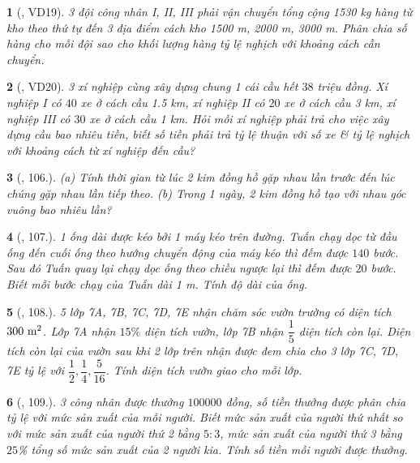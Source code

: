 \documentclass{article}
\newtheorem{baitoan}{}
\begin{document}
\begin{baitoan}[\cite{Binh_Toan_7_tap_1}, VD19]
	3 đội công nhân I, II, III phải vận chuyển tổng cộng {\rm1530 kg} hàng từ kho theo thứ tự đến 3 địa điểm cách kho {\rm1500 m, 2000 m, 3000 m}. Phân chia số hàng cho mỗi đội sao cho khối lượng hàng tỷ lệ nghịch với khoảng cách cần chuyển.
\end{baitoan}

\begin{baitoan}[\cite{Binh_Toan_7_tap_1}, VD20]
	3 xí nghiệp cùng xây dựng chung 1 cái cầu hết $38$ triệu đồng. Xí nghiệp I có $40$ xe ở cách cầu {\rm1.5 km}, xí nghiệp II có $20$ xe ở cách cầu {\rm3 km}, xí nghiệp III có $30$ xe ở cách cầu {\rm1 km}. Hỏi mỗi xí nghiệp phải trả cho việc xây dựng cầu bao nhiêu tiền, biết số tiền phải trả tỷ lệ thuận với số xe \& tỷ lệ nghịch với khoảng cách từ xí nghiệp đến cầu?
\end{baitoan}

\begin{baitoan}[\cite{Binh_Toan_7_tap_1}, 106.]
	
	(a) Tính thời gian từ lúc 2 kim đồng hồ gặp nhau lần trước đến lúc chúng gặp nhau lần tiếp theo.
	(b) Trong 1 ngày, 2 kim đồng hồ tạo với nhau góc vuông bao nhiêu lần?
	
\end{baitoan}

\begin{baitoan}[\cite{Binh_Toan_7_tap_1}, 107.]
	1 ống dài được kéo bởi 1 máy kéo trên đường. Tuấn chạy dọc từ đầu ống đến cuối ống theo hướng chuyển động của máy kéo thì đếm được $140$ bước. Sau đó Tuấn quay lại chạy dọc ống theo chiều ngược lại thì đếm được $20$ bước. Biết mỗi bước chạy của Tuấn dài {\rm1 m}. Tính độ dài của ống.
\end{baitoan}

\begin{baitoan}[\cite{Binh_Toan_7_tap_1}, 108.]
	5 lớp 7A, 7B, 7C, 7D, 7E nhận chăm sóc vườn trường có diện tích $\rm300\ m^2$. Lớp 7A nhận $15\%$ diện tích vườn, lớp 7B nhận $\dfrac{1}{5}$ diện tích còn lại. Diện tích còn lại của vườn sau khi 2 lớp trên nhận được đem chia cho 3 lớp 7C, 7D, 7E tỷ lệ với $\dfrac{1}{2},\dfrac{1}{4},\dfrac{5}{16}$. Tính diện tích vườn giao cho mỗi lớp.
\end{baitoan}

\begin{baitoan}[\cite{Binh_Toan_7_tap_1}, 109.]
	3 công nhân được thưởng $100000$ đồng, số tiền thưởng được phân chia tỷ lệ với mức sản xuất của mỗi người. Biết mức sản xuất của người thứ nhất so với mức sản xuất của người thứ 2 bằng $5:3$, mức sản xuất của người thứ 3 bằng $25$\% tổng số mức sản xuất của 2 người kia. Tính số tiền mỗi người được thưởng.
\end{baitoan}
\end{document}
